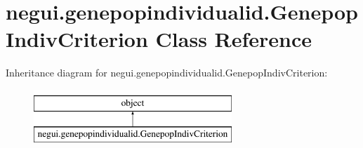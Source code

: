\hypertarget{classnegui_1_1genepopindividualid_1_1GenepopIndivCriterion}{}\section{negui.\+genepopindividualid.\+Genepop\+Indiv\+Criterion Class Reference}
\label{classnegui_1_1genepopindividualid_1_1GenepopIndivCriterion}
Inheritance diagram for negui.\+genepopindividualid.\+Genepop\+Indiv\+Criterion\+:\begin{figure}[H]
\begin{center}
\leavevmode
\includegraphics[height=2.000000cm]{classnegui_1_1genepopindividualid_1_1GenepopIndivCriterion}
\end{center}
\end{figure}
